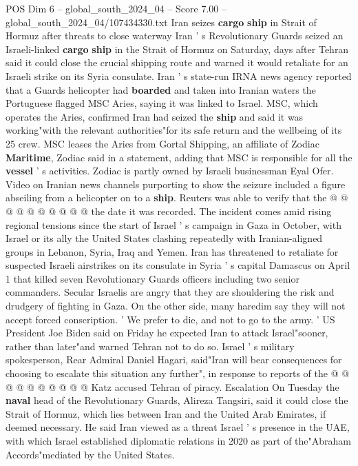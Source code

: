 \begin{textsample}{POS Dim 6 – global\_south\_2024\_04 – Score 7.00 – global\_south\_2024\_04/107434330.txt}  \label{ex:f6_pos_089}
Iran seizes \textbf{cargo} \textbf{ship} in Strait of Hormuz after threats to close waterway Iran ' s Revolutionary Guards seized an Israeli-linked \textbf{cargo} \textbf{ship} in the Strait of Hormuz on Saturday, days after Tehran said it could close the crucial shipping route and warned it would retaliate for an Israeli strike on its Syria consulate.
Iran ' s state-run IRNA news agency reported that a Guards helicopter had \textbf{boarded} and taken into Iranian waters the Portuguese flagged MSC Aries, saying it was linked to Israel.
MSC, which operates the Aries, confirmed Iran had seized the \textbf{ship} and said it was working"with the relevant authorities"for its safe return and the wellbeing of its 25 crew.
MSC leases the Aries from Gortal Shipping, an affiliate of Zodiac \textbf{Maritime}, Zodiac said in a statement, adding that MSC is responsible for all the \textbf{vessel} ' s activities.
Zodiac is partly owned by Israeli businessman Eyal Ofer.
Video on Iranian news channels purporting to show the seizure included a figure abseiling from a helicopter on to a \textbf{ship}.
Reuters was able to verify that the @ @ @ @ @ @ @ @ @ @ the date it was recorded.
The incident comes amid rising regional tensions since the start of Israel ' s campaign in Gaza in October, with Israel or its ally the United States clashing repeatedly with Iranian-aligned groups in Lebanon, Syria, Iraq and Yemen.
Iran has threatened to retaliate for suspected Israeli airstrikes on its consulate in Syria ' s capital Damascus on April 1 that killed seven Revolutionary Guards officers including two senior commanders.
Secular Israelis are angry that they are shouldering the risk and drudgery of fighting in Gaza.
On the other side, many haredim say they will not accept forced conscription. ' We prefer to die, and not to go to the army. ' US President Joe Biden said on Friday he expected Iran to attack Israel"sooner, rather than later"and warned Tehran not to do so.
Israel ' s military spokesperson, Rear Admiral Daniel Hagari, said"Iran will bear consequences for choosing to escalate this situation any further", in response to reports of the @ @ @ @ @ @ @ @ @ @ Katz accused Tehran of piracy.
Escalation On Tuesday the \textbf{naval} head of the Revolutionary Guards, Alireza Tangsiri, said it could close the Strait of Hormuz, which lies between Iran and the United Arab Emirates, if deemed necessary.
He said Iran viewed as a threat Israel ' s presence in the UAE, with which Israel established diplomatic relations in 2020 as part of the"Abraham Accords"mediated by the United States.

\end{textsample}
